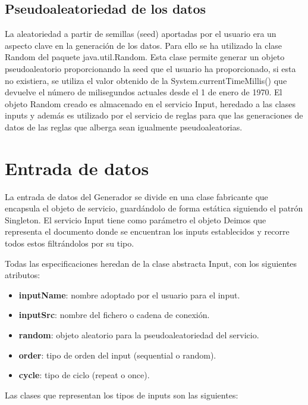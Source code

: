 \subsection{Pseudoaleatoriedad de los datos}

La aleatoriedad a partir de semillas (seed) aportadas por el usuario era un aspecto clave en la generación de los datos. Para ello se ha utilizado la clase Random del paquete java.util.Random. Esta clase permite generar un objeto pseudoaleatorio proporcionando la seed que el usuario ha proporcionado, si esta no existiera, se utiliza el valor obtenido de la System.currentTimeMillis() que devuelve el número de milisegundos actuales desde el 1 de enero de 1970. El objeto Random creado es almacenado en el servicio Input, heredado a las clases inputs y además es utilizado por el servicio de reglas para que las generaciones de datos de las reglas que alberga sean igualmente pseudoaleatorias.

\section{Entrada de datos}

La entrada de datos del Generador se divide en una clase fabricante que encapsula el objeto de servicio, guardándolo de forma estática siguiendo el patrón Singleton. El servicio Input tiene como parámetro el objeto Deimos que representa el documento donde se encuentran los inputs establecidos y recorre todos estos filtrándolos por su tipo.

Todas las especificaciones heredan de la clase abstracta Input, con los siguientes atributos:

\begin{itemize}
  \item \textbf{inputName}: nombre adoptado por el usuario para el input.
  \item \textbf{inputSrc}: nombre del fichero o cadena de conexión.
  \item \textbf{random}: objeto aleatorio para la pseudoaleatoriedad del servicio.
  \item \textbf{order}: tipo de orden del input (sequential o random).
  \item \textbf{cycle}: tipo de ciclo (repeat o once).
\end{itemize}

Las clases que representan los tipos de inputs son las siguientes:

